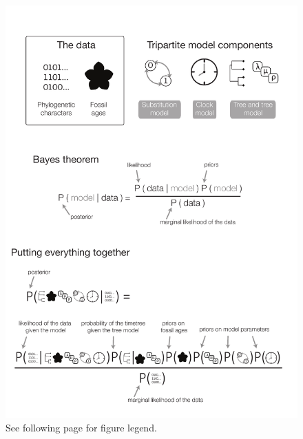 \documentclass[11pt]{article}
\begin{document}
\clearpage

\begin{figure}[h!]
\centering
\includegraphics[width=\textwidth]{figures/bayes-theorem-v2.pdf}
\caption{\footnotesize See following page for figure legend.}
\label{fig:bayes}
\end{figure}
\clearpage

\caption{\footnotesize \textbf{A tripartite model for Bayesian divergence time estimation.}
The top panel shows the key ingredients required during inference.
The data used to generate time calibrated trees: molecular or morphological phylogenetic characters, and age information, typically fossil sampling times.
The model includes the substitution (site) model, which describes the evolution of characters, the clock model, which describes the distribution of evolutionary rates across the tree, and the tree model, which describes the distribution of speciation events across the tree.
Bayes theorem is presented in the middle panel. 
The bottom panel illustrates how everything comes together for the Bayesian estimation of divergence times.
}
\end{document}
